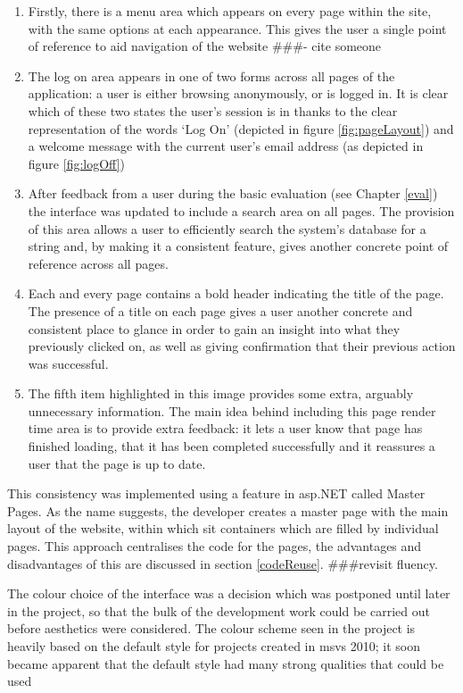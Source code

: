 \documentclass{l4proj}
\newcommand{\revisit}{\#\#\#}
\begin{document}
\begin{enumerate}
	\item Firstly, there is a menu area which appears on every page within the site, with the same options at each appearance.  This gives the user a single point of reference to aid navigation of the website \revisit - cite someone
	\item The log on area appears in one of two forms across all pages of the application: a user is either browsing anonymously, or is logged in.  It is clear which of these two states the user's session is in thanks to the clear representation of the words `Log On' (depicted in figure \ref{fig:pageLayout}) and a welcome message with the current user's email address (as depicted in figure \ref{fig:logOff})
	\item After feedback from a user during the basic evaluation (see Chapter \ref{eval}) the interface was updated to include a search area on all pages.  The provision of this area allows a user to efficiently search the system's database for a string and, by making it a consistent feature, gives another concrete point of reference across all pages.
	\item Each and every page contains a bold header indicating the title of the page.  The presence of a title on each page gives a user another concrete and consistent place to glance in order to gain an insight into what they previously clicked on, as well as giving confirmation that their previous action was successful.
	\item The fifth item highlighted in this image provides some extra, arguably unnecessary information.  The main idea behind including this page render time area is to provide extra feedback: it lets a user know that page has finished loading, that it has been completed successfully and it reassures a user that the page is up to date.
\end{enumerate}

This consistency was implemented using a feature in \gls{asp}.NET called Master Pages.  As the name suggests, the developer creates a master page with the main layout of the website, within which sit containers which are filled by individual pages.  This approach centralises the code for the pages, the advantages and disadvantages of this are discussed in section \ref{codeReuse}. \revisit revisit fluency.

The colour choice of the interface was a decision which was postponed until later in the project, so that the bulk of the development work could be carried out before aesthetics were considered.  The colour scheme seen in the project is heavily based on the default style for projects created in \gls{msvs} 2010; it soon became apparent that the default style had many strong qualities that could be used 
\end{document}
